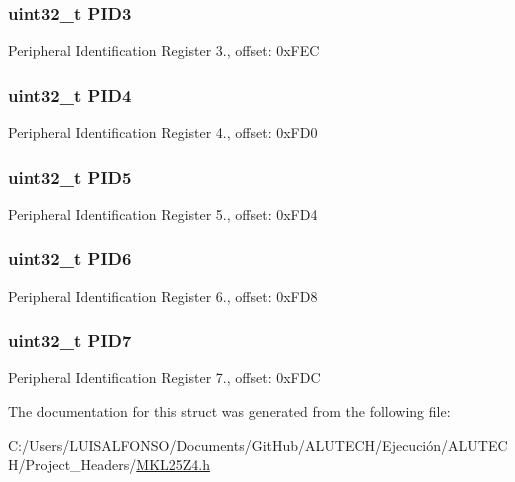 \subsubsection[{P\+I\+D3}]{\setlength{\rightskip}{0pt plus 5cm}uint32\+\_\+t P\+I\+D3}\label{struct_b_p___mem_map_acf224ed0d83cc1ae7b8492c6cd79e5dd}
Peripheral Identification Register 3., offset\+: 0x\+F\+E\+C \hypertarget{struct_b_p___mem_map_a4b742da36aa92236a876883d225769d9}{}
\subsubsection[{P\+I\+D4}]{\setlength{\rightskip}{0pt plus 5cm}uint32\+\_\+t P\+I\+D4}\label{struct_b_p___mem_map_a4b742da36aa92236a876883d225769d9}
Peripheral Identification Register 4., offset\+: 0x\+F\+D0 \hypertarget{struct_b_p___mem_map_a89a2228208ede3f7821c62acc24817e7}{}
\subsubsection[{P\+I\+D5}]{\setlength{\rightskip}{0pt plus 5cm}uint32\+\_\+t P\+I\+D5}\label{struct_b_p___mem_map_a89a2228208ede3f7821c62acc24817e7}
Peripheral Identification Register 5., offset\+: 0x\+F\+D4 \hypertarget{struct_b_p___mem_map_afbf6d9cf2860db9747fe2490f0a52bc9}{}
\subsubsection[{P\+I\+D6}]{\setlength{\rightskip}{0pt plus 5cm}uint32\+\_\+t P\+I\+D6}\label{struct_b_p___mem_map_afbf6d9cf2860db9747fe2490f0a52bc9}
Peripheral Identification Register 6., offset\+: 0x\+F\+D8 \hypertarget{struct_b_p___mem_map_a1658a67c3a52064ae611268d27ed5159}{}
\subsubsection[{P\+I\+D7}]{\setlength{\rightskip}{0pt plus 5cm}uint32\+\_\+t P\+I\+D7}\label{struct_b_p___mem_map_a1658a67c3a52064ae611268d27ed5159}
Peripheral Identification Register 7., offset\+: 0x\+F\+D\+C 

The documentation for this struct was generated from the following file\+:\begin{DoxyCompactItemize}
\item 
C\+:/\+Users/\+L\+U\+I\+S\+A\+L\+F\+O\+N\+S\+O/\+Documents/\+Git\+Hub/\+A\+L\+U\+T\+E\+C\+H/\+Ejecución/\+A\+L\+U\+T\+E\+C\+H/\+Project\+\_\+\+Headers/\hyperlink{_m_k_l25_z4_8h}{M\+K\+L25\+Z4.\+h}\end{DoxyCompactItemize}
